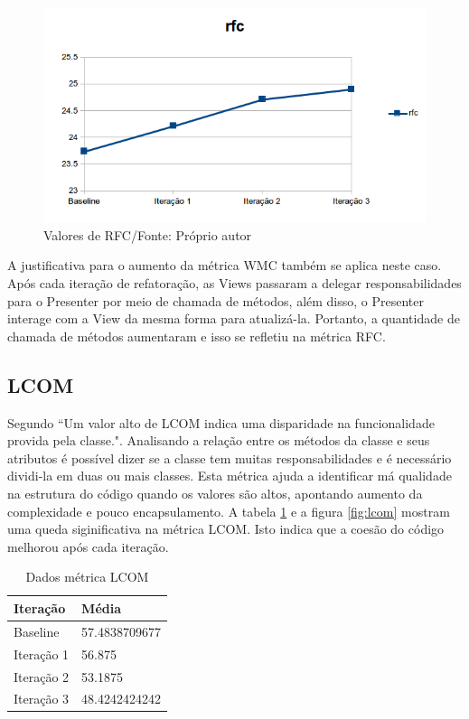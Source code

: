 \begin{figure}[!h]
	\centering
	\includegraphics{img/rfc.png}
	\caption{Valores de RFC/Fonte: Próprio autor}
	\label{fig:rfc}
\end{figure}

A justificativa para o aumento da métrica WMC também se aplica neste caso.
Após cada iteração de refatoração, as Views passaram a delegar
responsabilidades para o Presenter por meio de chamada de métodos, além disso, o Presenter interage com a
View da mesma forma para atualizá-la. Portanto, a quantidade de chamada de
métodos aumentaram e isso se refletiu na métrica RFC.

\subsection{LCOM}

Segundo  ``Um valor alto de LCOM indica uma disparidade na
funcionalidade provida pela classe.". Analisando a relação entre os métodos da
classe e seus atributos é possível dizer se a classe tem muitas
responsabilidades e é necessário dividi-la em duas ou mais classes. Esta métrica
ajuda a identificar má qualidade na estrutura do código quando os valores são
altos, apontando aumento da complexidade e pouco encapsulamento. A tabela
\ref{tab:lcom} e a figura \ref{fig:lcom} mostram uma queda siginificativa na
métrica LCOM. Isto indica que a coesão do código melhorou após cada iteração.

\begin{table}[!h]
	\centering
	    \caption{Dados métrica LCOM}
    \begin{tabular}{ | l | l | }
    \hline
    Iteração & Média 			\\ \hline
    Baseline & 57.4838709677   	\\ \hline
    Iteração 1 & 56.875			\\ \hline
	Iteração 2 & 53.1875		\\ \hline
	Iteração 3 & 48.4242424242	\\ \hline
    \end{tabular}
    \label{tab:lcom}
\end{table}

